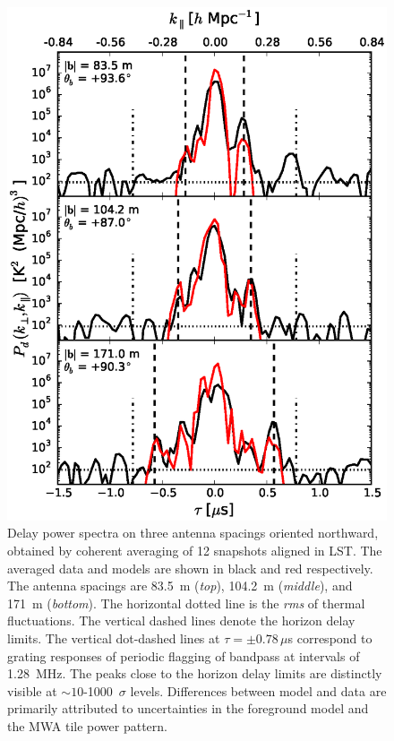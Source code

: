 \documentclass[preprint2,apjl,numberedappendix,twocolappendix,appendixfloats]{emulateapj}
\begin{document}
\begin{figure}[htb]
\centering
\includegraphics[width=\linewidth]{3_baseline_comparison_CLEAN_fhd_avg_visibilities_amplitudes_185.0_MHz_30.7_MHz.eps}
\caption{Delay power spectra on three antenna spacings oriented northward, obtained by coherent averaging of 12 snapshots aligned in LST. The averaged data and models are shown in black and red respectively. The antenna spacings are 83.5~m ({\it top}), 104.2~m ({\it middle}), and 171~m ({\it bottom}). The horizontal dotted line is the {\it rms} of thermal fluctuations. The vertical dashed lines denote the horizon delay limits. The vertical dot-dashed lines at $\tau=\pm 0.78\,\mu$s correspond to grating responses of periodic flagging of bandpass at intervals of 1.28~MHz. The peaks close to the horizon delay limits are distinctly visible at $\sim 10$-1000~$\sigma$ levels. Differences between model and data are primarily attributed to uncertainties in the foreground model and the MWA tile power pattern. \label{fig:3-baseline-comparison-delay-spectra}}
\end{figure}
\end{document}

